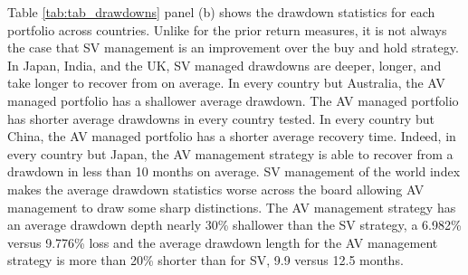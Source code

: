 Table \ref{tab:tab_drawdowns} panel (b) shows the drawdown statistics for each portfolio across countries. Unlike for the prior return measures, it is not always the case that SV management is an improvement over the buy and hold strategy. In Japan, India, and the UK, SV managed drawdowns are deeper, longer, and take longer to recover from on average. In every country but Australia, the AV managed portfolio has a shallower average drawdown. The AV managed portfolio has shorter average drawdowns in every country tested. In every country but China, the AV managed portfolio has a shorter average recovery time. Indeed, in every country but Japan, the AV management strategy is able to recover from a drawdown in less than 10 months on average. SV management of the world index makes the average drawdown statistics worse across the board allowing AV management to draw some sharp distinctions. The AV management strategy has an average drawdown depth nearly 30\% shallower than the SV strategy, a 6.982\% versus 9.776\% loss and the average drawdown length for the AV management strategy is more than 20\% shorter than for SV, 9.9 versus 12.5 months.
